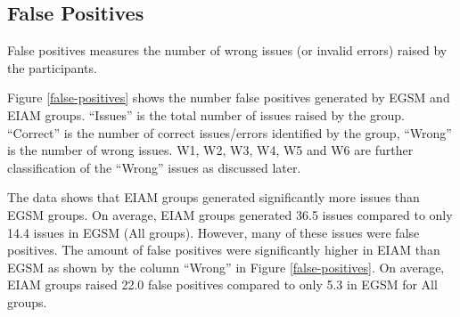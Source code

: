 \subsection{False Positives}

False positives measures the number of wrong issues (or invalid
errors) raised by the participants.

Figure \ref{false-positives} shows the number false positives generated
by EGSM and EIAM groups. ``Issues'' is the
total number of issues raised by the group. ``Correct'' is the number
of correct issues/errors identified by the group, ``Wrong'' is the
number of wrong issues. W1, W2, W3, W4, W5 and W6 are further
classification of the ``Wrong'' issues as discussed later.

The data shows that EIAM groups
generated significantly more issues than EGSM groups. 
On average, EIAM groups generated 36.5 issues compared to only 14.4
issues in EGSM (All groups). 
However, many of these issues were 
false positives. The amount of false positives  were
significantly higher in EIAM than EGSM as shown by the column
``Wrong'' in Figure \ref{false-positives}. 
On average, EIAM groups raised 22.0 false positives compared to
only 5.3 in EGSM for All groups.

